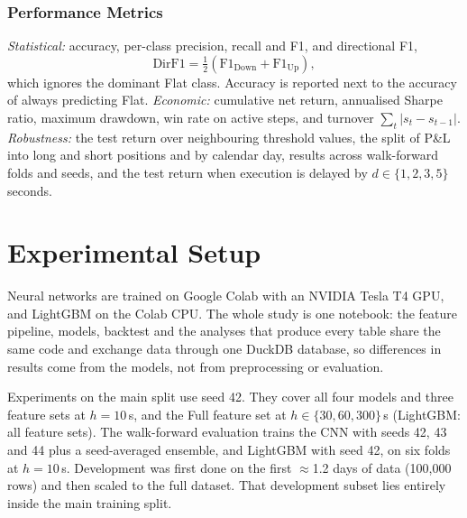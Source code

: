 \subsubsection{Performance Metrics}
\emph{Statistical:} accuracy, per-class precision, recall and F1, and directional F1,
\begin{equation}
  \mathrm{DirF1} = \tfrac12\left(\mathrm{F1}_{\text{Down}} + \mathrm{F1}_{\text{Up}}\right),
\end{equation}
which ignores the dominant Flat class. Accuracy is reported next to the accuracy of always
predicting Flat.
\emph{Economic:} cumulative net return, annualised Sharpe ratio, maximum drawdown, win rate
on active steps, and turnover $\sum_t |s_t - s_{t-1}|$.
\emph{Robustness:} the test return over neighbouring threshold values, the split of P\&L
into long and short positions and by calendar day, results across walk-forward folds and
seeds, and the test return when execution is delayed by $d \in \{1,2,3,5\}$ seconds.


\section{Experimental Setup}
\label{sec:setup}
Neural networks are trained on Google Colab with an NVIDIA Tesla T4 GPU, and LightGBM on
the Colab CPU. The whole study is one notebook: the feature pipeline, models, backtest and
the analyses that produce every table share the same code and exchange data through one
DuckDB database, so differences in results come from the models, not from preprocessing or
evaluation.

Experiments on the main split use seed 42. They cover all four models and three feature
sets at $h=10$\,s, and the Full feature set at $h\in\{30,60,300\}$\,s (LightGBM: all
feature sets). The walk-forward evaluation trains the CNN with seeds 42, 43 and 44 plus
a seed-averaged ensemble, and LightGBM with seed 42, on six folds at $h=10$\,s.
Development was first done on the first $\approx$1.2 days of data (100,000 rows) and then
scaled to the full dataset. That development subset lies entirely inside the main
training split.

